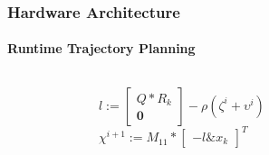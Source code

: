 \documentclass{beamer}
\begin{document}
\begin{frame}

\frametitle{Hardware Architecture}
\framesubtitle{Runtime Trajectory Planning}

\begin{columns}[c] %

\begin{figure}[t]
\end{figure}

$l:=
\begin{bmatrix}
	Q*R_k\\
	\textbf{0}
\end{bmatrix}-\rho (\zeta^{i}+\upsilon^{i})$ \\
	$\chi^{i+1}:=
	M_{11}*
	\begin{bmatrix}
	-l\&x_{k}
	\end{bmatrix}^T$



\end{columns}
\end{frame}
\end{document}
